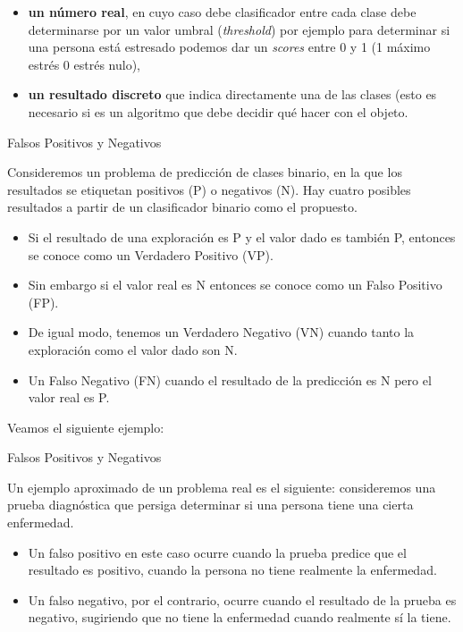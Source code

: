 \documentclass[
  letterpaper,
  DIV=11,
  numbers=noendperiod]{scrreprt}
\providecommand{\tightlist}{%
  \setlength{\itemsep}{0pt}\setlength{\parskip}{0pt}}\usepackage{longtable,booktabs,array}
\begin{document}
\begin{itemize}
\tightlist
\item
  \textbf{un número real}, en cuyo caso debe clasificador entre cada
  clase debe determinarse por un valor umbral (\emph{threshold}) por
  ejemplo para determinar si una persona está estresado podemos dar un
  \emph{scores} entre 0 y 1 (1 máximo estrés 0 estrés nulo),
\item
  \textbf{un resultado discreto} que indica directamente una de las
  clases (esto es necesario si es un algoritmo que debe decidir qué
  hacer con el objeto.
\end{itemize}

Falsos Positivos y Negativos

Consideremos un problema de predicción de clases binario, en la que los
resultados se etiquetan positivos (P) o negativos (N). Hay cuatro
posibles resultados a partir de un clasificador binario como el
propuesto.

\begin{itemize}
\tightlist
\item
  Si el resultado de una exploración es P y el valor dado es también P,
  entonces se conoce como un Verdadero Positivo (VP).
\item
  Sin embargo si el valor real es N entonces se conoce como un Falso
  Positivo (FP).
\item
  De igual modo, tenemos un Verdadero Negativo (VN) cuando tanto la
  exploración como el valor dado son N.
\item
  Un Falso Negativo (FN) cuando el resultado de la predicción es N pero
  el valor real es P.
\end{itemize}

Veamos el siguiente ejemplo:

Falsos Positivos y Negativos

Un ejemplo aproximado de un problema real es el siguiente: consideremos
una prueba diagnóstica que persiga determinar si una persona tiene una
cierta enfermedad.

\begin{itemize}
\tightlist
\item
  Un falso positivo en este caso ocurre cuando la prueba predice que el
  resultado es positivo, cuando la persona no tiene realmente la
  enfermedad.
\item
  Un falso negativo, por el contrario, ocurre cuando el resultado de la
  prueba es negativo, sugiriendo que no tiene la enfermedad cuando
  realmente sí la tiene.
\end{itemize}
\end{document}
